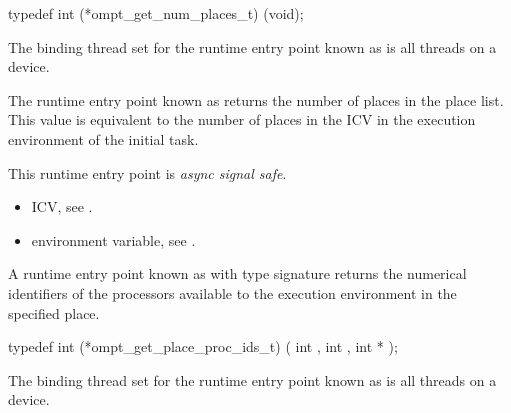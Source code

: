 \format

\begin{ccppspecific}
\begin{omptInquiry}
typedef int (*ompt_get_num_places_t) (void);
\end{omptInquiry}
\end{ccppspecific}

\binding

The binding thread set for
the runtime entry point known as 
is all threads on a device.

\descr

The runtime entry point known as  
returns the number of places in the place list.
This value is equivalent to the number of places in
the   ICV in the execution environment
of the initial task.

This runtime entry point is \emph{async signal safe}.

\crossreferences
\begin{itemize}
\item {} ICV, see
.

\item {} environment variable, see
.
\end{itemize}




\label{sec:ompt_get_place_proc_ids_t}
\label{sec:ompt_get_place_proc_ids}

\summary

A runtime entry point known as
 with type signature
returns the numerical identifiers of the processors
available to the execution environment in the specified place.

\format

\begin{ccppspecific}
\begin{omptInquiry}
typedef int (*ompt_get_place_proc_ids_t) (
  int ,
  int ,
  int *
);
\end{omptInquiry}
\end{ccppspecific}

\binding

The binding thread set for
the runtime entry point known as 
is all threads on a device.

